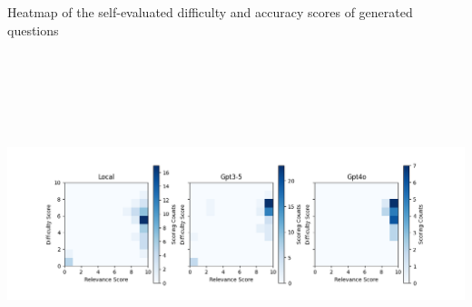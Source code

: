 {
	Heatmap of the self-evaluated difficulty and accuracy scores of generated questions
    \begin{tikzfigure}
        \vspace*{-2.5cm}
        \hspace*{-1cm}
        \includegraphics[height=10cm]{figures/eval_plot.png}
    \end{tikzfigure}
    \vspace*{-2.5cm}
}


